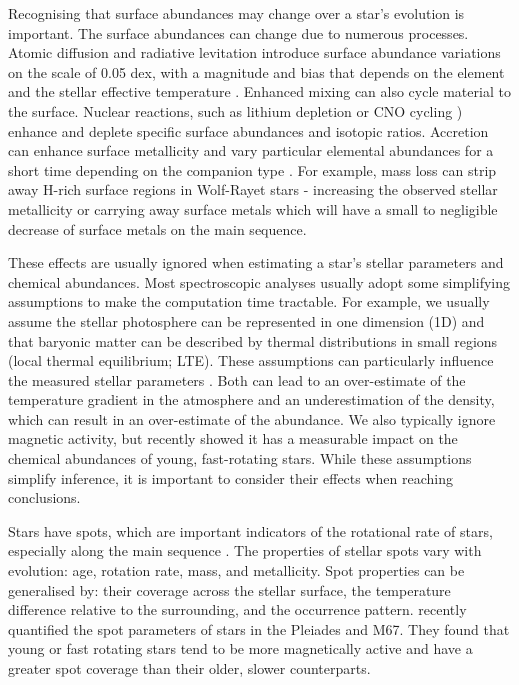 Recognising that surface abundances may change over a star's evolution is important. The surface abundances can change due to numerous processes. Atomic diffusion and radiative levitation introduce surface abundance variations on the scale of 0.05 dex, with a magnitude and bias that depends on the element and the stellar effective temperature \citep{onehag_abundances_2014}. Enhanced mixing can also cycle material to the surface. Nuclear reactions, such as lithium depletion \citep{pinsonneault_stellar_2002} or CNO cycling \citep{crowther_physical_2007}) enhance and deplete specific surface abundances and isotopic ratios. Accretion can enhance surface metallicity and vary particular elemental abundances for a short time depending on the companion type \citep{pasquini_evolved_2007, maldonado_connecting_2019, laughlin_possible_1997}. For example, mass loss can strip away H-rich surface regions in Wolf-Rayet stars \citep{crowther_physical_2007} - increasing the observed stellar metallicity or carrying away surface metals which will have a small to negligible decrease of surface metals on the main sequence. 

These effects are usually ignored when estimating a star's stellar parameters and chemical abundances. Most spectroscopic analyses usually adopt some simplifying assumptions to make the computation time tractable.
For example, we usually assume the stellar photosphere can be represented in one dimension (1D) and that baryonic matter can be described by thermal distributions in small regions (local thermal equilibrium; LTE). These assumptions can particularly influence the measured stellar parameters \citep[e.g.,][]{blanco-cuaresma_modern_2019}. Both can lead to an over-estimate of the temperature gradient in the atmosphere and an underestimation of the density, which can result in an over-estimate of the abundance. We also typically ignore magnetic activity, but recently \citet{spina_how_2020} showed it has a measurable impact on the chemical abundances of young, fast-rotating stars.
While these assumptions simplify inference, it is important to consider their effects when reaching conclusions.

Stars have spots, which are important indicators of the rotational rate of stars, especially along the main sequence \citep{mcquillan_rotation_2014, santos_surface_2021}. The properties of stellar spots vary with evolution: age, rotation rate, mass, and metallicity. Spot properties can be generalised by: their coverage across the stellar surface, the temperature difference relative to the surrounding, and the occurrence pattern.
\citet{cao_starspots_2022} recently quantified the spot parameters of stars in the Pleiades and M67. They found that young or fast rotating stars tend to be more magnetically active and have a greater spot coverage than their older, slower counterparts. 


